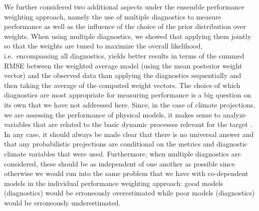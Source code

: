 We further considered two additional aspects under the ensemble performance weighting approach, namely the use of multiple diagnostics to measure performance as well as the influence of the choice of the prior distribution over weights.
When using multiple diagnostics, we showed that applying them jointly so that the weights are tuned to maximize the overall likelihood, i.e.~encompassing all diagnostics, yields better results in terms of the summed RMSE between the weighted average model (using the mean posterior weight vector) and the observed data than applying the diagnostics sequentially and then taking the average of the computed weight vectors. The choice of which diagnostics are most appropriate for measuring performance is a big question on its own \citep[e.g., see][]{glecklerPerformanceMetricsClimate2008} that we have not addressed here. 
Since, in the case of climate projections, we are assessing the performance of physical models, it makes sense to analyze variables that are related to the basic dynamic processes relevant for the target \citep{katzenbergerDevelopingGuidelinesWorking2025}. In any case, it should always be made clear that there is no universal answer and that any probabilistic projections are conditional on the metrics and diagnostic climate variables that were used. Furthermore, when multiple diagnostics are considered, these should be as independent of one another as possible since otherwise we would run into the same problem that we have with co-dependent models in the individual performance weighting approach: good models (diagnostics) would be erroneously overestimated while poor models (diagnostics) would be erroneously underestimated.


